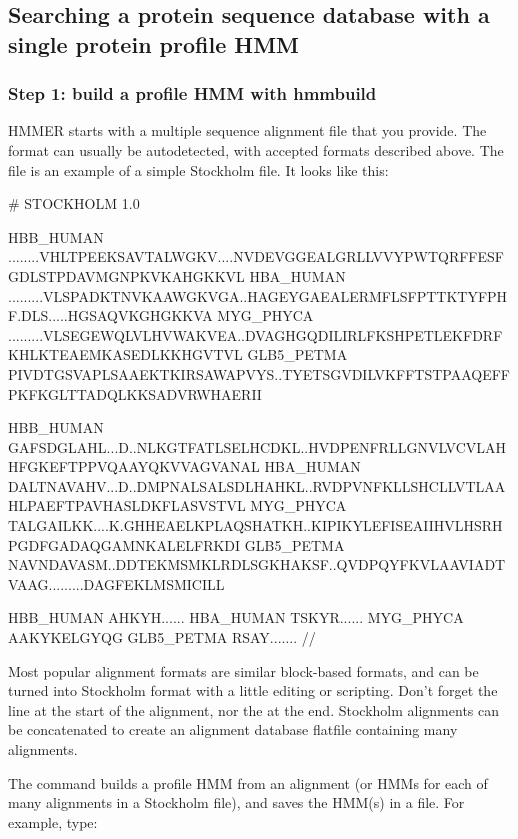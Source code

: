 \subsection{Searching a protein sequence database with a single protein profile HMM}

\subsubsection{Step 1: build a profile HMM with hmmbuild}

HMMER starts with a multiple sequence alignment file that you
provide. The format can usually be autodetected, with
accepted formats described above. The file  is an
example of a simple Stockholm file. It looks like this:

\begin{samepage}
\begin{sreoutput}
# STOCKHOLM 1.0

HBB_HUMAN   ........VHLTPEEKSAVTALWGKV....NVDEVGGEALGRLLVVYPWTQRFFESFGDLSTPDAVMGNPKVKAHGKKVL
HBA_HUMAN   .........VLSPADKTNVKAAWGKVGA..HAGEYGAEALERMFLSFPTTKTYFPHF.DLS.....HGSAQVKGHGKKVA
MYG_PHYCA   .........VLSEGEWQLVLHVWAKVEA..DVAGHGQDILIRLFKSHPETLEKFDRFKHLKTEAEMKASEDLKKHGVTVL
GLB5_PETMA  PIVDTGSVAPLSAAEKTKIRSAWAPVYS..TYETSGVDILVKFFTSTPAAQEFFPKFKGLTTADQLKKSADVRWHAERII

HBB_HUMAN   GAFSDGLAHL...D..NLKGTFATLSELHCDKL..HVDPENFRLLGNVLVCVLAHHFGKEFTPPVQAAYQKVVAGVANAL
HBA_HUMAN   DALTNAVAHV...D..DMPNALSALSDLHAHKL..RVDPVNFKLLSHCLLVTLAAHLPAEFTPAVHASLDKFLASVSTVL
MYG_PHYCA   TALGAILKK....K.GHHEAELKPLAQSHATKH..KIPIKYLEFISEAIIHVLHSRHPGDFGADAQGAMNKALELFRKDI
GLB5_PETMA  NAVNDAVASM..DDTEKMSMKLRDLSGKHAKSF..QVDPQYFKVLAAVIADTVAAG.........DAGFEKLMSMICILL

HBB_HUMAN   AHKYH......
HBA_HUMAN   TSKYR......
MYG_PHYCA   AAKYKELGYQG
GLB5_PETMA  RSAY.......
//
\end{sreoutput}
\end{samepage}

Most popular alignment formats are similar block-based formats, and
can be turned into Stockholm format with a little editing or
scripting. Don't forget the  line at the start
of the alignment, nor the \prog{//} at the end. Stockholm alignments
can be concatenated to create an alignment database flatfile
containing many alignments.

The  command builds a profile HMM from an alignment (or
HMMs for each of many alignments in a Stockholm file), and saves the
HMM(s) in a file. For example, type:

